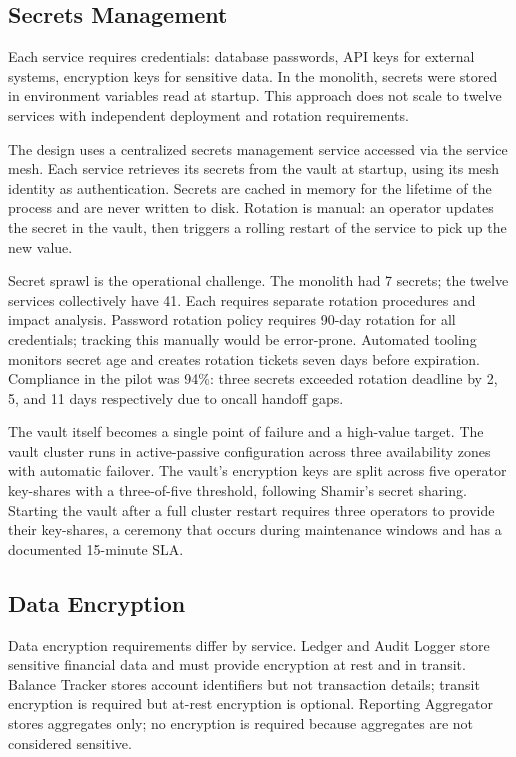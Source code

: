 \subsection{Secrets Management}

Each service requires credentials: database passwords, API keys for external systems, encryption keys for sensitive data. In the monolith, secrets were stored in environment variables read at startup. This approach does not scale to twelve services with independent deployment and rotation requirements.

The design uses a centralized secrets management service accessed via the service mesh. Each service retrieves its secrets from the vault at startup, using its mesh identity as authentication. Secrets are cached in memory for the lifetime of the process and are never written to disk. Rotation is manual: an operator updates the secret in the vault, then triggers a rolling restart of the service to pick up the new value.

Secret sprawl is the operational challenge. The monolith had 7 secrets; the twelve services collectively have 41. Each requires separate rotation procedures and impact analysis. Password rotation policy requires 90-day rotation for all credentials; tracking this manually would be error-prone. Automated tooling monitors secret age and creates rotation tickets seven days before expiration. Compliance in the pilot was 94\%: three secrets exceeded rotation deadline by 2, 5, and 11 days respectively due to oncall handoff gaps.

The vault itself becomes a single point of failure and a high-value target. The vault cluster runs in active-passive configuration across three availability zones with automatic failover. The vault's encryption keys are split across five operator key-shares with a three-of-five threshold, following Shamir's secret sharing. Starting the vault after a full cluster restart requires three operators to provide their key-shares, a ceremony that occurs during maintenance windows and has a documented 15-minute SLA.

\subsection{Data Encryption}

Data encryption requirements differ by service. Ledger and Audit Logger store sensitive financial data and must provide encryption at rest and in transit. Balance Tracker stores account identifiers but not transaction details; transit encryption is required but at-rest encryption is optional. Reporting Aggregator stores aggregates only; no encryption is required because aggregates are not considered sensitive.

